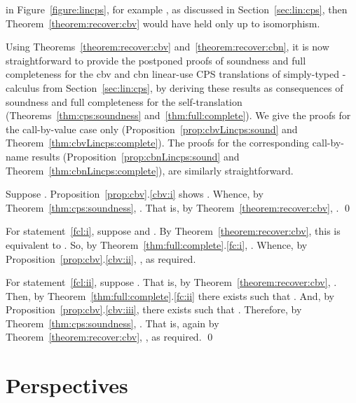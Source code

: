 \documentclass{LMCS}
\begin{document}
in Figure~\ref{figure:lincps}, for example
,
as discussed in Section~\ref{sec:lin:cps}, then Theorem~\ref{theorem:recover:cbv}
would have held only up to isomorphism. 

Using Theorems~\ref{theorem:recover:cbv} and~\ref{theorem:recover:cbn}, it is now straightforward
to provide the postponed proofs of soundness
and full completeness for the cbv and cbn linear-use CPS translations of simply-typed -calculus from
Section~\ref{sec:lin:cps}, by deriving  these
results as consequences of soundness and full completeness for the self-translation
(Theorems~\ref{thm:cps:soundness} and~\ref{thm:full:complete}).
We give the proofs for the call-by-value case only 
(Proposition~\ref{prop:cbvLincps:sound} and Theorem~\ref{thm:cbvLincps:complete}).
The proofs for the corresponding call-by-name results 
(Proposition~\ref{prop:cbnLincps:sound} and Theorem~\ref{thm:cbnLincps:complete}),
are similarly straightforward.

Suppose
. Proposition~\ref{prop:cbv}.\ref{cbv:i} shows
.
Whence, by Theorem~\ref{thm:cps:soundness},
.
That is, by Theorem~\ref{theorem:recover:cbv},
.
\qed

For statement~\ref{fcl:i}, suppose  and 
.
By Theorem~\ref{theorem:recover:cbv}, this is equivalent to
.
So, by Theorem~\ref{thm:full:complete}.\ref{fc:i},
.
Whence, by Proposition~\ref{prop:cbv}.\ref{cbv:ii},
, as required.


For statement~\ref{fcl:ii}, 
suppose 
.
That is, by Theorem~\ref{theorem:recover:cbv},
.
Then, by Theorem~\ref{thm:full:complete}.\ref{fc:ii} there exists 
 such that
.
And, by Proposition~\ref{prop:cbv}.\ref{cbv:iii},
there exists  such that
.
Therefore, by Theorem~\ref{thm:cps:soundness},
.
That is, again by Theorem~\ref{theorem:recover:cbv},
, as required.
\qed


\section{Perspectives}
\label{section:perspectives}
\end{document}
